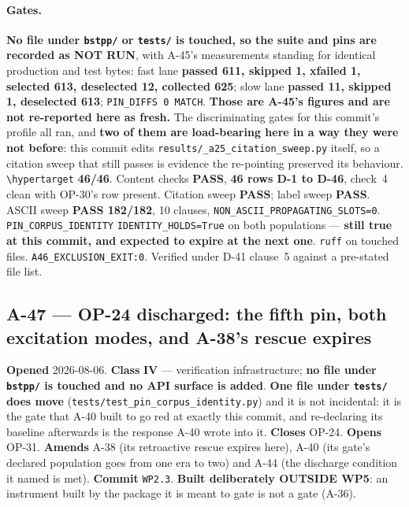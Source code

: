 \documentclass[
  10pt,
]{article}
\begin{document}
\paragraph{Gates.}
\textbf{No file under \texttt{bstpp/} or \texttt{tests/} is touched, so the suite and pins are recorded as NOT RUN}, with A-45's measurements standing for identical production and test bytes: fast lane \textbf{passed 611, skipped 1, xfailed 1, selected 613, deselected 12, collected 625}; slow lane \textbf{passed 11, skipped 1, deselected 613}; \texttt{PIN\_DIFFS 0 MATCH}. \textbf{Those are A-45's figures and are not re-reported here as fresh.} The discriminating gates for this commit's profile all ran, and \textbf{two of them are load-bearing here in a way they were not before}: this commit edits \texttt{results/\allowbreak{}\_a25\_citation\_sweep.py} itself, so a citation sweep that still passes is evidence the re-pointing preserved its behaviour. \texttt{\textbackslash hypertarget} \textbf{46/46}. Content checks \textbf{PASS}, \textbf{46 rows D-1 to D-46}, check~4 clean with OP-30's row present. Citation sweep \textbf{PASS}; label sweep \textbf{PASS}. ASCII sweep \textbf{PASS 182/182}, 10 clauses, \texttt{NON\_ASCII\_PROPAGATING\_SLOTS=0}. \texttt{PIN\_CORPUS\_IDENTITY} \texttt{IDENTITY\_HOLDS=True} on both populations --- \textbf{still true at this commit, and expected to expire at the next one}. \texttt{ruff} on touched files. \texttt{A46\_EXCLUSION\_EXIT:0}. Verified under D-41 clause~5 against a pre-stated file list.

\hypertarget{a-47}{%
\subsection{A-47 --- OP-24 discharged: the fifth pin, both excitation modes, and A-38's rescue expires}\label{a-47}}

\textbf{Opened} 2026-08-06. \textbf{Class} \textbf{IV} --- verification infrastructure; \textbf{no file under \texttt{bstpp/} is touched and no API surface is added}. \textbf{One file under \texttt{tests/} does move} (\texttt{tests/\allowbreak{}test\_pin\_corpus\_identity.py}) and it is not incidental: it is the gate that A-40 built to go red at exactly this commit, and re-declaring its baseline afterwards is the response A-40 wrote into it. \textbf{Closes} OP-24. \textbf{Opens} OP-31. \textbf{Amends} A-38 (its retroactive rescue expires here), A-40 (its gate's declared population goes from one era to two) and A-44 (the discharge condition it named is met). \textbf{Commit} \texttt{WP2.3}. \textbf{Built deliberately OUTSIDE WP5}: an instrument built by the package it is meant to gate is not a gate (A-36).
\end{document}
